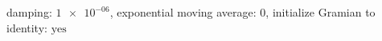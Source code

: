 damping: $\num[scientific-notation=true]{1e-06}$, exponential moving average: $\num[scientific-notation=false]{0}$, initialize Gramian to identity: $\text{yes}$